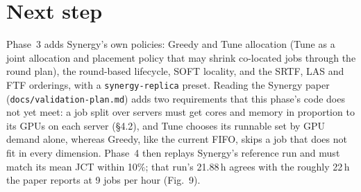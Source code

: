 \documentclass[11pt,a4paper]{article}
\newcommand{\code}[1]{\texttt{#1}}
\begin{document}
\section{Next step}
Phase~3 adds Synergy's own policies: Greedy and Tune allocation (Tune as a joint allocation and
placement policy that may shrink co-located jobs through the round plan), the round-based lifecycle,
SOFT locality, and the SRTF, LAS and FTF orderings, with a \code{synergy-replica} preset. Reading the
Synergy paper (\code{docs/validation-plan.md}) adds two requirements that this phase's code does not yet
meet: a job split over servers must get cores and memory in proportion to its GPUs on each server
(\S4.2), and Tune chooses its runnable set by GPU demand alone, whereas Greedy, like the current FIFO,
skips a job that does not fit in every dimension. Phase~4 then replays Synergy's reference run and must
match its mean JCT within 10\%; that run's 21.88\,h agrees with the roughly 22\,h the paper reports at
9 jobs per hour (Fig.~9).
\end{document}
